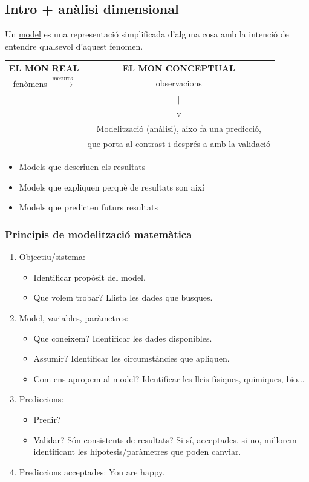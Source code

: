\documentclass[../main.tex]{subfiles}
\begin{document}
\subsection{Intro + anàlisi dimensional}
\begin{definicio}
    Un \underline{model} es una representació simplificada d'alguna cosa amb la intenció de entendre qualsevol d'aquest fenomen.
\end{definicio}
\begin{tabular}{c|c}
    \textbf{EL MON REAL} & \textbf{EL MON CONCEPTUAL}\\
    fenòmens $\xrightarrow{\text{mesures}}$& observacions\\
     & $|$\\
     & v\\
     & Modelització (anàlisi), aixo fa una predicció,\\
     & que porta al contrast i després a amb la validació 
\end{tabular}
\begin{itemize}
    \item Models que descriuen els resultats
    \item Models que expliquen perquè de resultats son així
    \item Models que predicten futurs resultats
\end{itemize}
\subsubsection{Principis de modelització matemàtica}
\begin{enumerate}
    \item Objectiu/sistema: \begin{itemize}
        \item Identificar propòsit del model.
        \item Que volem trobar? Llista les dades que busques.
    \end{itemize}
    \item Model, variables, paràmetres: \begin{itemize}
        \item Que coneixem? Identificar les dades disponibles.
        \item Assumir? Identificar les circumstàncies que apliquen.
        \item Com ens apropem al model? Identificar les lleis físiques, quimiques, bio...
    \end{itemize}
    \item Prediccions: \begin{itemize}
        \item Predir?
        \item Validar? Són consistents de resultats? Si sí, acceptades, si no, millorem identificant les hipotesis/paràmetres que poden canviar.
    \end{itemize}
    \item Prediccions acceptades: You are happy.
\end{enumerate}
\end{document}
